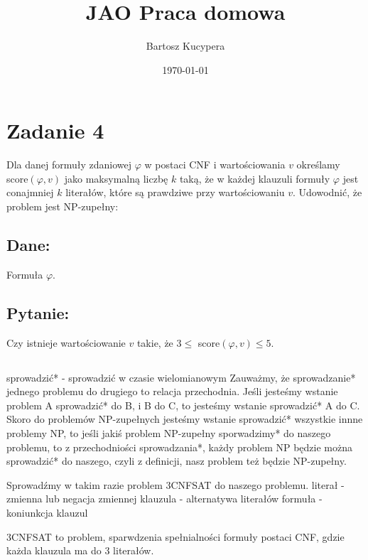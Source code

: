 \documentclass{article}
\title{JAO Praca domowa}
\author{Bartosz Kucypera}
\date{\today}
\begin{document}
\maketitle

\section*{Zadanie 4}
Dla danej formuły zdaniowej $\varphi$ w postaci CNF i wartościowania $v$ określamy score$(\varphi, v)$ jako maksymalną liczbę $k$ taką, że w każdej klauzuli formuły $\varphi$ jest conajmniej $k$ literałów, które są prawdziwe przy wartościowaniu $v$. \newline
Udowodnić, że problem jest NP-zupełny:
\subsection*{Dane:}
Formuła $\varphi$.
\subsection*{Pytanie:}
Czy istnieje wartościowanie $v$ takie, że $3\le$ score$(\varphi, v) \le 5$.

\subsection*{}
sprowadzić* - sprowadzić w czasie wielomianowym \newline
Zauważmy, że sprowadzanie* jednego problemu do drugiego to relacja przechodnia. Jeśli jesteśmy wstanie problem A sprowadzić* do B, i B do C, to jesteśmy wstanie sprowadzić* A do C. \newline 
Skoro do problemów NP-zupełnych jesteśmy wstanie sprowadzić* wszystkie innne problemy NP, to jeśli jakiś problem NP-zupełny sporwadzimy* do naszego problemu, to z przechodniości sprowadzania*, każdy problem NP będzie można sprowadzić* do naszego, czyli z definicji, nasz problem też będzie NP-zupełny.\newline

Sprowadźmy w takim razie problem 3CNFSAT do naszego problemu. \newline \newline
literał - zmienna lub negacja zmiennej \newline
klauzula - alternatywa literałów \newline
formuła - koniunkcja klauzul \newline

3CNFSAT to problem, sparwdzenia spełnialności formuły postaci CNF, gdzie każda klauzula ma do 3 literałów.
\end{document}
